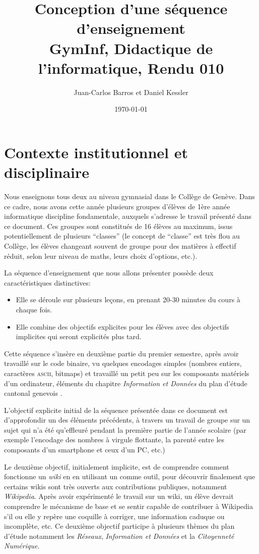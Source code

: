 \documentclass[11pt,bibliography=totoc]{scrartcl}
\author{Juan-Carlos Barros et Daniel Kessler}
\date{\today}
\title{Conception d'une séquence d'enseignement\\\medskip
  \large GymInf, Didactique de l'informatique, Rendu 010}
\begin{document}
\maketitle
\tableofcontents  %
\pagebreak

\section{Contexte institutionnel et disciplinaire}
Nous enseignons tous deux au niveau gymnasial dans le Collège de Genève. Dans ce
cadre, nous avons cette année plusieurs groupes d'élèves de 1ère année
informatique discipline fondamentale, auxquels s'adresse le travail présenté
dans ce document. Ces groupes sont constitués de 16 élèves au maximum, issus
potentiellement de plusieurs ``classes'' (le concept de ``classe'' est très flou
au Collège, les élèves changeant souvent de groupe pour des matières à effectif
réduit, selon leur niveau de maths, leurs choix d'options, etc.).

La séquence d'enseignement que nous allons présenter possède deux
caractéristiques distinctives:
\begin{itemize}
\item Elle se déroule sur plusieurs leçons, en prenant 20-30 minutes du cours à
  chaque fois.
\item Elle combine des objectifs explicites pour les élèves avec des objectifs
  implicites qui seront explicités plus tard.
\end{itemize}

Cette séquence s'insère en deuxième partie du premier semestre, après avoir
travaillé sur le code binaire, vu quelques encodages simples (nombres entiers,
caractères \textsc{ascii}, bitmaps) et travaillé un petit peu sur les composants
matériels d'un ordinateur, éléments du chapitre \textit{Information et Données}
du plan d'étude cantonal genevois \autocite{pecinfo}.

L'objectif explicite initial de la séquence présentée dans ce document est
d'approfondir un des éléments précédents, à travers un travail de groupe sur un
sujet qui n'a été qu'effleuré pendant la première partie de l'année scolaire
(par exemple l'encodage des nombres à virgule flottante, la parenté entre les
composants d'un smartphone et ceux d'un PC, etc.)

Le deuxième objectif, initialement implicite, est de comprendre comment
fonctionne un \textit{wiki} en en utilisant un comme outil, pour découvrir
finalement que certains wikis sont très ouverts aux contributions publiques,
notamment \textit{Wikipedia}. Après avoir expérimenté le travail sur un wiki, un
élève devrait comprendre le mécanisme de base et se sentir capable de contribuer
à Wikipedia s'il ou elle y repère une coquille à corriger, une information
caduque ou incomplète, etc. Ce deuxième objectif participe à plusieurs thèmes du
plan d'étude notamment les \textit{Réseaux}, \textit{Information et Données} et
la \textit{Citoyenneté Numérique}.
\end{document}
